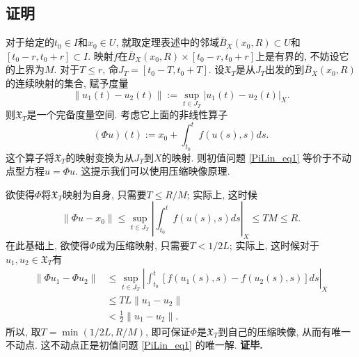 \subsection{证明}
对于给定的$t_0\in I$和$x_0\in U$, 就取定理表述中的邻域$\bar B_X(x_0,R)\subset U$和$[t_0-r,t_0+r]\subset I$. 映射$f$在$\bar B_X(x_0,R)\times[t_0-r,t_0+r]$上是有界的, 不妨设它的上界为$M$. 对于$T\leq r$, 命$J_T=[t_0-T,t_0+T]$. 设$\mathfrak{X}_T$是从$J_T$出发的到$\bar B_X(x_0,R)$的连续映射的集合, 赋予度量
$$
\|u_1(t)-u_2(t)\|:=\sup_{t\in J_T}|u_1(t)-u_2(t)|_X.
$$
则$\mathfrak{X}_T$是一个完备度量空间. 考虑它上面的非线性算子
$$
(\Phi u)(t):=x_0+\int_{t_0}^tf(u(s),s)ds.
$$ 
这个算子将$\mathfrak{X}_T$的映射变换为从$J_T$到$X$的映射. 则初值问题 \autoref{PiLin_eq1} 等价于不动点型方程$u=\Phi u$. 这提示我们可以使用压缩映像原理.

欲使得$\Phi$将$\mathfrak{X}_T$映射为自身, 只需要$T\leq R/M$; 实际上, 这时候
$$
\|\Phi u-x_0\|
\leq\sup_{t\in J_T}\left|\int_{t_0}^tf(u(s),s)ds\right|_X
\leq TM\leq R.
$$
在此基础上, 欲使得$\Phi$成为压缩映射, 只需要$T<1/2L$; 实际上, 这时候对于$u_1,u_2\in\mathfrak{X}_T$有
$$
\begin{aligned}
\|\Phi u_1-\Phi u_2\|
&\leq\sup_{t\in J_T}\left|\int_{t_0}^t[f(u_1(s),s)-f(u_2(s),s)]ds\right|_X \\
&\leq TL\|u_1-u_2\|\\
&<\frac{1}{2}\|u_1-u_2\|.
\end{aligned}
$$
所以, 取$T=\min\left(1/2L,R/M\right)$, 即可保证$\Phi$是$\mathfrak{X}_T$到自己的压缩映像, 从而有唯一不动点. 这不动点正是初值问题 \autoref{PiLin_eq1} 的唯一解. \textbf{证毕.}